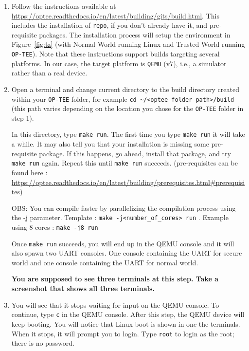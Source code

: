 \documentclass[10pt]{article}
\begin{document}
\begin{enumerate}
 \item Follow the instructions available at \url{https://optee.readthedocs.io/en/latest/building/gits/build.html}. This includes the installation of \verb|repo|, if you don't already have it, and pre-requisite packages. The installation process will  setup the environment in Figure~\ref{fig:tz} (with Normal World running Linux and Trusted World running \verb|OP-TEE|). Note that these instructions support builds targeting several platforms. In our case, the target platform is \verb|QEMU| (v7), i.e., a simulator rather than a real device.  

 \item  Open a terminal and change current directory to the build directory created within your \verb|OP-TEE| folder, for example \verb|cd ~/<optee folder path>/build| (this path varies depending on the location you chose for the \verb|OP-TEE| folder in step 1).

In this directory, type \verb|make run|.
The first time you type \verb|make run| it will take a while. It may also tell you that your installation is missing some pre-requisite package. If this happens, go ahead, install that package, and try \verb|make run| again. Repeat this until \verb|make run| succeeds. 
(pre-requisites can be found here : \url{https://optee.readthedocs.io/en/latest/building/prerequisites.html#prerequisites})

OBS: You can compile faster by parallelizing the compilation process using the -j parameter. Template :
\verb|make -j<number_of_cores> run| . Example using 8 cores : \verb|make -j8 run|



Once \verb|make run| succeeds, you will end up in the QEMU console and it will also spawn two UART consoles. One console containing the UART for secure world and one console containing the UART for normal world.

{\bf \color{red}You are supposed to see three terminals at this step. Take a screenshot that shows all three terminals.}

\item You will see that it stops waiting for input on the QEMU console. To continue, type \verb|c| in the QEMU console.
After this step, the QEMU device will keep booting. You will notice that Linux boot is shown in one the terminals.
When it stops, it will prompt you to login. 
Type \verb|root| to login as the root; there is no password.


\end{enumerate}
\end{document}
